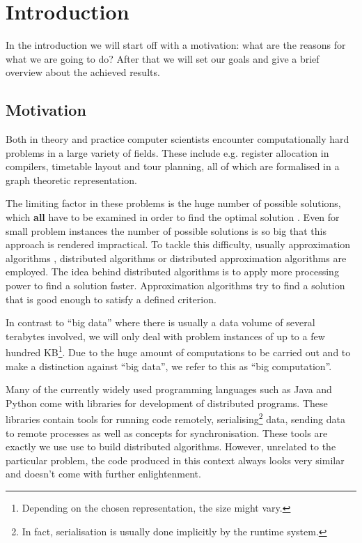 \chapter{Introduction}
In the introduction we will start off with a motivation: what are the reasons for what we are going to do? After that we will set our goals and give a brief overview about the achieved results.

\section{Motivation}
Both in theory and practice computer scientists encounter computationally hard problems in a large variety of fields. These include e.g. register allocation in compilers, timetable layout and tour planning, all of which are formalised in a graph theoretic \cite{Garey:1979:CIG:578533} representation.

The limiting factor in these problems is the huge number of possible solutions, which \textbf{all} have to be examined in order to find the optimal solution \cite{Garey:1979:CIG:578533}. Even for small problem instances the number of possible solutions is so big that this approach is rendered impractical. To tackle this difficulty, usually approximation algorithms \cite{}, distributed algorithms or distributed approximation algorithms are employed. The idea behind distributed algorithms is to apply more processing power to find a solution faster. Approximation algorithms try to find a solution that is good enough to satisfy a defined criterion.

In contrast to \enquote{big data} where there is usually a data volume of several terabytes involved, we will only deal with problem instances of up to a few hundred KB\footnote{Depending on the chosen representation, the size might vary.}. Due to the huge amount of computations to be carried out and to make a distinction against \enquote{big data}, we refer to this as \enquote{big computation}.

Many of the currently widely used programming languages such as Java and Python come with libraries for development of distributed programs. These libraries contain tools for running code remotely, serialising\footnote{In fact, serialisation is usually done implicitly by the runtime system.} data, sending data to remote processes as well as concepts for synchronisation. These tools are exactly we use use to build distributed algorithms. However, unrelated to the particular problem, the code produced in this context always looks very similar and doesn't come with further enlightenment.

